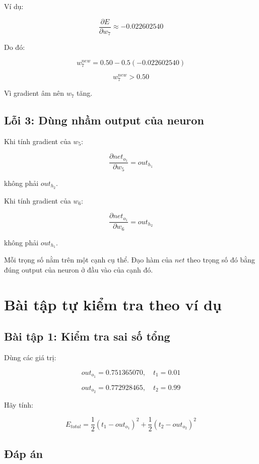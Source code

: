 \documentclass[12pt,a4paper]{report}
\begin{document}
Ví dụ:

\[
    \frac{\partial E}{\partial w_7}\approx -0.022602540
\]

Do đó:

\[
    w_7^{new}
    =
    0.50
    -
    0.5(-0.022602540)
\]

\[
    w_7^{new}>0.50
\]

Vì gradient âm nên $w_7$ tăng.

\section{Lỗi 3: Dùng nhầm output của neuron}

Khi tính gradient của $w_5$:

\[
    \frac{\partial net_{o_1}}{\partial w_5}=out_{h_1}
\]

không phải $out_{h_2}$.

Khi tính gradient của $w_6$:

\[
    \frac{\partial net_{o_1}}{\partial w_6}=out_{h_2}
\]

không phải $out_{h_1}$.

\begin{luuy}
Mỗi trọng số nằm trên một cạnh cụ thể. Đạo hàm của $net$ theo trọng số đó bằng đúng output của neuron ở đầu vào của cạnh đó.
\end{luuy}

\chapter{Bài tập tự kiểm tra theo ví dụ}

\section*{Bài tập 1: Kiểm tra sai số tổng}

Dùng các giá trị:

\[
    out_{o_1}=0.751365070,\quad t_1=0.01
\]

\[
    out_{o_2}=0.772928465,\quad t_2=0.99
\]

Hãy tính:

\[
    E_{total}
    =
    \frac{1}{2}(t_1-out_{o_1})^2
    +
    \frac{1}{2}(t_2-out_{o_2})^2
\]

\section*{Đáp án}
\end{document}
